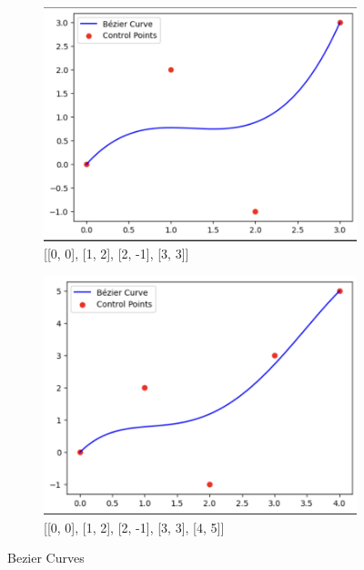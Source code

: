 \documentclass[10pt,a4paper]{article}
\begin{document}
\begin{figure}[H]
\centering
\begin{subfigure}[b]{0.25\textwidth}
    \centering
    \includegraphics[width=\textwidth,height=0.25\textheight,keepaspectratio]{VisualComputingReportResults/CubicBezierCurve}
    \caption{\small [[0, 0], [1, 2], [2, -1], [3, 3]]}
    \label{fig:cubic}
\end{subfigure}
\hspace{0.1\textwidth}
\begin{subfigure}[b]{0.25\textwidth}
    \centering
    \includegraphics[width=\textwidth,height=0.25\textheight,keepaspectratio]{VisualComputingReportResults/QuarticBezierCurve}
    \caption{\small [[0, 0], [1, 2], [2, -1], [3, 3], [4, 5]]}
    \label{fig:quartic}
\end{subfigure}
\caption{\small Bezier Curves}
\label{fig:bezier_curves}
\end{figure}
\end{document}
